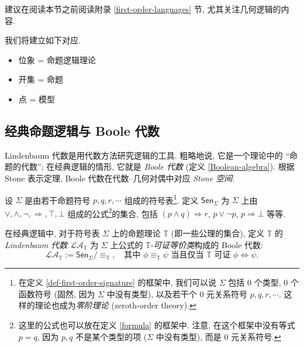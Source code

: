\label{locales-and-logic}


建议在阅读本节之前阅读附录 \ref{first-order-languages} 节, 尤其关注几何逻辑的内容.


我们将建立如下对应.

\begin{itemize}
	\item 位象 = 命题逻辑理论
	\item 开集 = 命题
	\item 点 = 模型
\end{itemize}

\subsection{经典命题逻辑与 Boole 代数}

Lindenbaum 代数是用代数方法研究逻辑的工具. 粗略地说, 它是一个理论中的 ``命题的代数''; 在经典逻辑的情形, 它就是 \emph{Boole 代数} (定义 \ref{Boolean-algebra}). 根据 Stone 表示定理, Boole 代数在代数--几何对偶中对应 \emph{Stone 空间}.

设 $\Sigma$ 是由若干命题符号 $p,q,r,\cdots$ 组成的符号表\footnote{在定义 \ref{def-first-order-signature} 的框架中, 我们可以说 $\Sigma$ 包括 $0$ 个类型, $0$ 个函数符号 (固然, 因为 $\Sigma$ 中没有类型), 以及若干个 $0$ 元关系符号 $p,q,r,\cdots$. 这样的理论也成为\emph{零阶理论} (zeroth-order theory).}.
定义 $\mathsf {Sen}_\Sigma$ 为 $\Sigma$ 上由 $\lor,\land,\neg,\Rightarrow,\top,\bot$ 组成的公式\footnote{这里的公式也可以放在定义 \ref{formula} 的框架中. 注意, 在这个框架中没有等式 $p=q$, 因为 $p,q$ 不是某个类型的项 ($\Sigma$ 中没有类型), 而是 $0$ 元关系符号.}的集合, 包括 $(p\land q)\Rightarrow r$, $p\lor\neg p$, $p\Rightarrow\bot$ 等等.

\newcommand{\LA}{\mathcal {LA}}

\begin{definition}
	{}
	在经典逻辑中, 对于符号表 $\Sigma$ 上的命题理论 $\mathbb T$ (即一些公理的集合), 定义 $\mathbb T$ 的 \emph{Lindenbaum 代数} $\LA_{\mathbb T}$ 为 $\Sigma$ 上公式的 $\mathbb T$-\emph{可证等价类}构成的 Boole 代数:
	$$
	\LA_{\mathbb T} := \mathsf {Sen}_\Sigma \big/ {\equiv_{\mathbb T}},\quad
	\text{其中 $\phi\equiv_{\mathbb T} \psi$ 当且仅当 $\mathbb T$ 可证 $\phi\Leftrightarrow\psi$}.
	$$
\end{definition}

